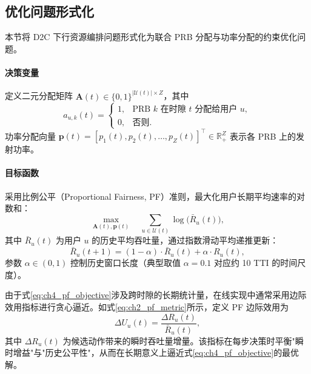 \documentclass[type=master]{fduthesis}
\begin{document}
\subsection{优化问题形式化}
\label{subsec:ch4_opt_formulation}

本节将 D2C 下行资源编排问题形式化为联合 PRB 分配与功率分配的约束优化问题。

\paragraph{决策变量}
定义二元分配矩阵 $\mathbf{A}(t) \in \{0,1\}^{|\mathcal{U}(t)| \times Z}$，其中
\begin{equation}
a_{u,k}(t) =
\begin{cases}
1, & \text{PRB } k \text{ 在时隙 } t \text{ 分配给用户 } u, \\
0, & \text{否则}.
\end{cases}
\label{eq:ch4_allocation_var}
\end{equation}
功率分配向量 $\mathbf{p}(t) = [p_1(t), p_2(t), \ldots, p_Z(t)]^\top \in \mathbb{R}_+^Z$ 表示各 PRB 上的发射功率。

\paragraph{目标函数}
采用比例公平（Proportional Fairness, PF）准则，最大化用户长期平均速率的对数和：
\begin{equation}
\max_{\mathbf{A}(t), \mathbf{p}(t)} \quad \sum_{u \in \mathcal{U}(t)} \log\big(\bar{R}_u(t)\big),
\label{eq:ch4_pf_objective}
\end{equation}
其中 $\bar{R}_u(t)$ 为用户 $u$ 的历史平均吞吐量，通过指数滑动平均递推更新：
\begin{equation}
\bar{R}_u(t+1) = (1 - \alpha) \cdot \bar{R}_u(t) + \alpha \cdot R_u(t),
\label{eq:ch4_ema_update}
\end{equation}
参数 $\alpha \in (0,1)$ 控制历史窗口长度（典型取值 $\alpha = 0.1$ 对应约 10 TTI 的时间尺度）。

由于式\eqref{eq:ch4_pf_objective}涉及跨时隙的长期统计量，在线实现中通常采用边际效用指标进行贪心逼近。如式\eqref{eq:ch2_pf_metric}所示，定义 PF 边际效用为
\begin{equation}
\Delta U_u(t) = \frac{\Delta R_u(t)}{\bar{R}_u(t)},
\label{eq:ch4_pf_metric}
\end{equation}
其中 $\Delta R_u(t)$ 为候选动作带来的瞬时吞吐量增量。该指标在每步决策时平衡"瞬时增益"与"历史公平性"，从而在长期意义上逼近式\eqref{eq:ch4_pf_objective}的最优解。
\end{document}
